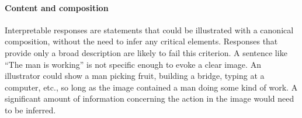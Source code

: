 \documentclass[12pt,notitlepage]{article}
\newcommand{\lk}[1]{\marginpar{\linespread{1}\scriptsize LK: #1}}
\begin{document}

%
%



\paragraph{Content and composition} Interpretable responses are statements that could be illustrated with a canonical composition, without the need to infer any critical elements. Responses that provide only a broad description are likely to fail this criterion. A sentence like ``The man is working'' is not specific enough to evoke a clear image. An illustrator could show a man picking fruit, building a bridge, typing at a computer, etc., so long as the image contained a man doing some kind of work. A significant amount of information concerning the action in the image would need to be inferred.
\end{document}
